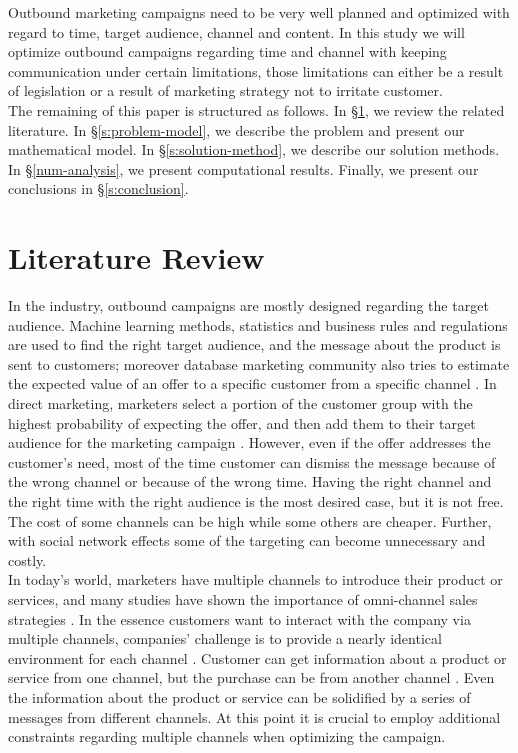 \documentclass[11pt]{article}
\begin{document}
Outbound marketing campaigns need to be very well planned and optimized with regard to time, target audience, channel and content. In this study we will optimize outbound campaigns regarding time and channel with keeping communication under certain limitations, those limitations can either be a result of legislation or a result of marketing strategy not to irritate customer.\\

The remaining of this paper is structured as follows. In \S \ref{s:literature-review}, we review the related literature. In \S \ref{s:problem-model}, we describe the problem and present our mathematical model. In \S \ref{s:solution-method}, we describe our solution methods. In \S \ref{num-analysis}, we present computational results. Finally, we present our conclusions in \S \ref{s:conclusion}.




\section{Literature Review}  \label{s:literature-review}

In the industry, outbound campaigns are mostly designed regarding the target audience. Machine learning methods, statistics and business rules and regulations are used to find the right target audience, and the message about the product is sent to customers; moreover database marketing community also tries to estimate the expected value of an offer to a specific customer from a specific channel \citep{cohen_exp, oliveira_hypr}. In direct marketing, marketers select a portion of the customer group with the highest probability of expecting the offer, and then add them to their target audience for the marketing campaign \citep{owczarczuk}. However, even if the offer addresses the customer’s need, most of the time customer can dismiss the message because of the wrong channel or because of the wrong time. Having the right channel and the right time with the right audience is the most desired case, but it is not free. The cost of some channels can be high while some others are cheaper. Further, with social network effects some of the targeting can become unnecessary and costly.\\

In today’s world, marketers have multiple channels to introduce their product or services, and many studies have shown the importance of omni-channel sales strategies \citep{shankar, park}. In the essence customers want to interact with the company via multiple channels, companies’ challenge is to provide a nearly identical environment for each channel \citep{bell}. Customer can get information about a product or service from one channel, but the purchase can be from another channel \citep{park}. Even the information about the product or service can be solidified by a series of messages from different channels. At this point it is crucial to employ additional constraints regarding multiple channels when optimizing the campaign.\\
\end{document}
